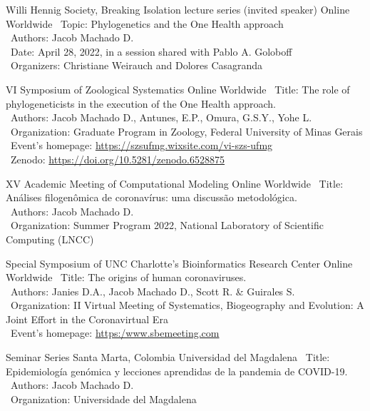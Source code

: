 \documentclass[11pt, letterpaper, sans]{moderncv}
\begin{document}
\cventry{---}
	{Willi Hennig Society, Breaking Isolation lecture series (invited speaker)}
	{Online}
	{Worldwide}
	{}
	{
		\textbullet~Topic: Phylogenetics and the One Health approach\\
		\textbullet~Authors: Jacob Machado D.\\
		\textbullet~Date: April 28, 2022, in a session shared with Pablo A. Goloboff\\
		\textbullet~Organizers: Christiane Weirauch and Dolores Casagranda
	}

\cventry{---}
	{VI Symposium of Zoological Systematics}
	{Online}
	{Worldwide}
	{}
	{
		\textbullet~Title: The role of phylogeneticists in the execution of the One Health approach.\\
		\textbullet~Authors: Jacob Machado D., Antunes, E.P., Omura, G.S.Y., Yohe L.\\
		\textbullet~Organization: Graduate Program in Zoology, Federal University of Minas Gerais\\
		\textbullet~Event's homepage: \url{https://szsufmg.wixsite.com/vi-szs-ufmg}\\
		\textbullet~Zenodo: \url{https://doi.org/10.5281/zenodo.6528875}
	}

\cventry{---}
	{XV Academic Meeting of Computational Modeling}
	{Online}
	{Worldwide}
	{}
	{
		\textbullet~Title: Análises filogenômica de coronavírus: uma discussão metodológica.\\
		\textbullet~Authors: Jacob Machado D.\\
		\textbullet~Organization: Summer Program 2022, National Laboratory of Scientific Computing (LNCC)\\
	}

	{Special Symposium of UNC Charlotte's Bioinformatics Research Center}
	{Online}
	{Worldwide}
	{}
	{
		\textbullet~Title: The origins of human coronaviruses.\\
		\textbullet~Authors: Janies D.A., Jacob Machado D., Scott R. \& Guirales S.\\
		\textbullet~Organization: II Virtual Meeting of Systematics, Biogeography and Evolution: A Joint Effort in the Coronavirtual Era\\
		\textbullet~Event's homepage: \url{https:/www.sbemeeting.com}
	}

\cventry{---}
	{Seminar Series}
	{Santa Marta, Colombia}
	{Universidad del Magdalena}
	{}
	{
		\textbullet~Title: Epidemiología genómica y lecciones aprendidas de la pandemia de COVID-19.\\
		\textbullet~Authors: Jacob Machado D.\\
		\textbullet~Organization: Universidade del Magdalena\\
	}
\end{document}
